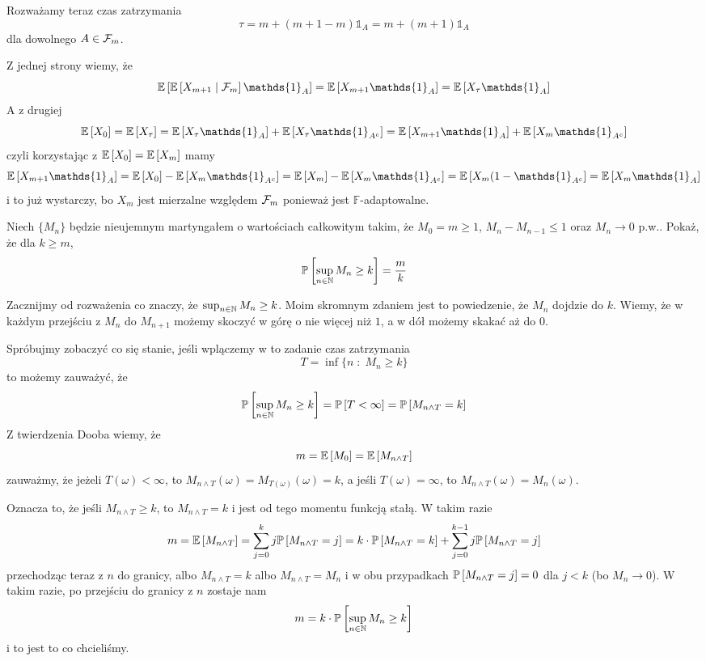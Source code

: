 \begin{solution}
\begin{enumerate}[label=(\alph*)]
      Rozważamy teraz czas zatrzymania
      $$\tau=m+(m+1-m)\mathds{1}_A=m+(m+1)\mathds{1}_A$$
      dla dowolnego $A\in\mathcal{F}_m$.

      Z jednej strony wiemy, że
      $$\expected{\expected{X_{m+1}}{\set{F}_m}\mathds{1}_A}=\expected{X_{m+1}\mathds{1}_A}=\expected{X_\tau\mathds{1}_A}$$
      A z drugiej
      $$\expected{X_0}=\expected{X_\tau}=\expected{X_\tau\mathds{1}_A}+\expected{X_\tau\mathds{1}_{A^c}}=\expected{X_{m+1}\mathds{1}_A}+\expected{X_m\mathds{1}_{A^c}}$$
      czyli korzystając z $\expected{X_0}=\expected{X_m}$ mamy
      $$\expected{X_{m+1}\mathds{1}_A}=\expected{X_0}-\expected{X_m\mathds{1}_{A^c}}=\expected{X_m}-\expected{X_m\mathds{1}_{A^c}}=\expected{X_m(1-\mathds{1}_{A^c}}=\expected{X_m\mathds{1}_A}$$
      i to już wystarczy, bo $X_m$ jest mierzalne względem $\mathcal{F}_m$ ponieważ jest $\mathds{F}$-adaptowalne.
  \end{enumerate}
\end{solution}

\begin{problem}
  Niech $\{M_n\}$ będzie nieujemnym martyngałem o wartościach całkowitym takim, że $M_0=m\geq1$, $M_n-M_{n-1}\leq 1$ oraz $M_n\to 0$ p.w.. Pokaż, że dla $k\geq m$,
  $$\prob{\sup_{n\in\N}M_n\geq k}=\frac{m}{k}$$
\end{problem}

\begin{solution}
  Zacznijmy od rozważenia co znaczy, że $\sup_{n\in\operatorname{\mathbb{N}}}M_n\geq k$. Moim skromnym zdaniem jest to powiedzenie, że $M_n$ dojdzie do $k$. Wiemy, że w każdym przejściu z $M_n$ do $M_{n+1}$ możemy skoczyć w górę o nie więcej niż $1$, a w dół możemy skakać aż do $0$.

  Spróbujmy zobaczyć co się stanie, jeśli wplączemy w to zadanie czas zatrzymania
  $$T=\inf\{n\;:\;M_n\geq k\}$$
  to możemy zauważyć, że 
  $$\prob{\sup_{n\in\N}M_n\geq k}=\prob{T<\infty}=\prob{M_{n\land T}=k}$$
  Z twierdzenia Dooba wiemy, że
  $$m=\expected{M_0}=\expected{M_{n\land T}}$$
  zauważmy, że jeżeli $T(\omega)<\infty$, to $M_{n\land T}(\omega)=M_{T(\omega)}(\omega)=k$, a jeśli $T(\omega)=\infty$, to $M_{n\land T}(\omega)=M_n(\omega)$. 

  Oznacza to, że jeśli $M_{n\land T}\geq k$, to $M_{n\land T}=k$ i jest od tego momentu funkcją stałą. W takim razie
  $$m=\expected{M_{n\land T}}=\sum_{j=0}^kj\prob{M_{n\land T}=j}=k\cdot\prob{M_{n\land T}=k}+\sum_{j=0}^{k-1}j\prob{M_{n\land T}=j}$$
  przechodząc teraz z $n$ do granicy, albo $M_{n\land T}=k$ albo $M_{n\land T}=M_n$ i w obu przypadkach $\prob{M_{n\land T}=j}=0$ dla $j<k$ (bo $M_n\to 0$). W takim razie, po przejściu do granicy z $n$ zostaje nam
  $$m=k\cdot\prob{\sup_{n\in\N}M_n\geq k}$$
  i to jest to co chcieliśmy.
\end{solution}
